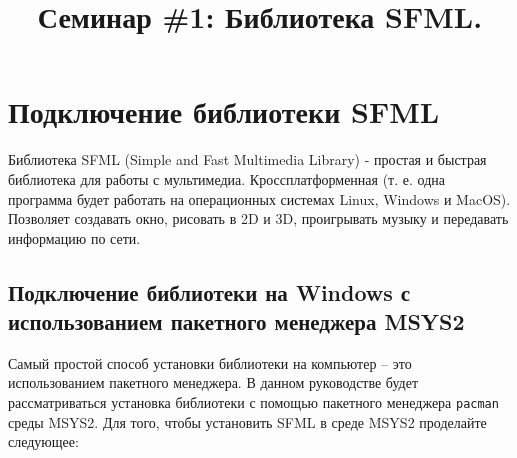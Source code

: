 \documentclass{article}
\begin{document}
\title{Семинар \#1: Библиотека SFML.\vspace{-5ex}}\date{}\maketitle


\section{Подключение библиотеки SFML}
Библиотека SFML (Simple and Fast Multimedia Library) - простая и быстрая библиотека для работы с мультимедиа. Кроссплатформенная (т. е. одна программа будет работать на операционных системах Linux, Windows и MacOS). Позволяет создавать окно, рисовать в 2D и 3D, проигрывать музыку и передавать информацию по сети. 

\subsection*{Подключение библиотеки на Windows с использованием пакетного менеджера MSYS2}
Самый простой способ установки библиотеки на компьютер -- это использованием пакетного менеджера. В данном руководстве будет рассматриваться установка библиотеки с помощью пакетного менеджера \texttt{pacman} среды MSYS2. Для того, чтобы установить SFML в среде MSYS2 проделайте следующее:
\end{document}
